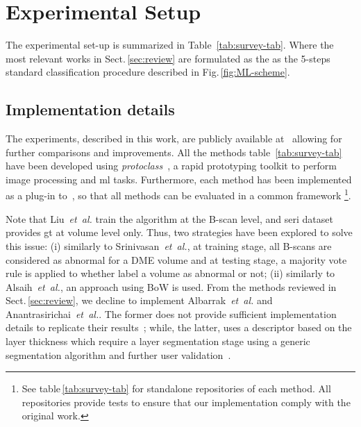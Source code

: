 \graphicspath{ {./content/method/figures/} }

\section{Experimental Setup}\label{sec:exp}

The experimental set-up is summarized in Table~\ref{tab:survey-tab}.
Where the most relevant works in Sect.\,\ref{sec:review} are formulated as the as the 5-steps standard classification procedure described in Fig.\,\ref{fig:ML-scheme}.



\subsection{Implementation details}\label{sec:exp:implementation}
The experiments, described in this work, are publicly available at~\cite{rethinopaty20016apr-repoICPR} allowing for further comparisons and improvements.
All the methods table~\ref{tab:survey-tab} have been developed using \emph{protoclass}~\cite{protoclass2016apr-repoICPR}, a rapid prototyping toolkit to perform image processing and \gls{ml} tasks.
Furthermore, each method has been implemented as a plug-in to~\cite{rethinopaty20016apr-repoICPR}, so that all methods can be evaluated in a common framework
\footnote{See table\,\ref{tab:survey-tab} for standalone repositories of each method. All repositories provide tests to ensure that our implementation comply with the original work.}.

Note that Liu~\emph{et~al.} train the algorithm at the B-scan level, and \gls{seri} dataset provides \gls{gt} at volume level only.
Thus, two strategies have been explored to solve this issue:
(i) similarly to Srinivasan~\emph{et~al.}, at training stage, all B-scans are considered as abnormal for a DME volume and at testing stage, a majority vote rule is applied to whether label a volume as abnormal or not;
(ii) similarly to Alsaih~\emph{et~al.}, an approach using BoW is used.
From the methods reviewed in Sect.\,\ref{sec:review}, we decline to implement Albarrak~\emph{et~al.} and Anantrasirichai~\textit{et~al.}.
The former does not provide sufficient implementation details to replicate their results~\cite{albarrak2013age};
while, the latter, uses a descriptor based on the layer thickness which require a layer segmentation stage using a generic segmentation algorithm and further user validation~\cite{anantrasirichai2013svm}.



